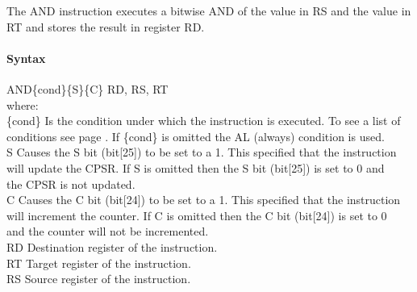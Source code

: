 \documentclass[12pt]{article}
\begin{document}
    \noindent
    The AND instruction executes a bitwise AND of the value in RS and the value in RT and stores the result in register RD. 
    
    \paragraph{Syntax}
    \begin{flushleft}
    AND\{cond\}\{S\}\{C\} RD, RS, RT\\
    \vspace{1em}        %
    where:\\
    \vspace{1em}
    \{cond\}    \hspace{2em} Is the condition under which the instruction is executed. To see a list of\\
                \hspace{5.4em} conditions see page . If \{cond\} is omitted the AL (always) condition is used.\\
    \vspace{1em}    
    S       \hspace{4.5em} Causes the S bit (bit[25]) to be set to a 1. This specified that the instruction\\
            \hspace{5.4em} will update the CPSR. If S is omitted then the S bit (bit[25]) is set to 0 and\\
            \hspace{5.4em} the CPSR is not updated.\\
    \vspace{1em}    
    C       \hspace{4.5em} Causes the C bit (bit[24]) to be set to a 1. This specified that the instruction\\
            \hspace{5.4em} will increment the counter. If C is omitted then the C bit (bit[24]) is set to 0\\
            \hspace{5.4em} and the counter will not be incremented.\\
    \vspace{1em}
    RD  \hspace{3.6em} Destination register of the instruction.\\
    \vspace{1em}
    RT  \hspace{3.7em} Target register of the instruction.\\
    \vspace{1em}
    RS  \hspace{3.85em} Source register of the instruction.\\
    \end{flushleft}
    
\end{document}
